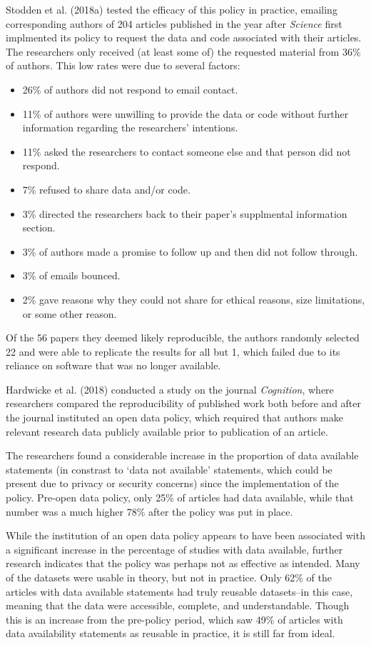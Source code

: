 \documentclass[12pt,twoside]{reedthesis}
\providecommand{\tightlist}{%
  \setlength{\itemsep}{0pt}\setlength{\parskip}{0pt}}
\begin{document}
Stodden et al. (2018a) tested the efficacy of this policy in practice, emailing corresponding authors of 204 articles published in the year after \emph{Science} first implmented its policy to request the data and code associated with their articles. The researchers only received (at least some of) the requested material from 36\% of authors. This low rates were due to several factors:
\begin{itemize}
\tightlist
\item
  26\% of authors did not respond to email contact.
\item
  11\% of authors were unwilling to provide the data or code without further information regarding the researchers' intentions.
\item
  11\% asked the researchers to contact someone else and that person did not respond.
\item
  7\% refused to share data and/or code.
\item
  3\% directed the researchers back to their paper's supplmental information section.
\item
  3\% of authors made a promise to follow up and then did not follow through.
\item
  3\% of emails bounced.
\item
  2\% gave reasons why they could not share for ethical reasons, size limitations, or some other reason.
\end{itemize}
Of the 56 papers they deemed likely reproducible, the authors randomly selected 22 and were able to replicate the results for all but 1, which failed due to its reliance on software that was no longer available.

Hardwicke et al. (2018) conducted a study on the journal \emph{Cognition}, where researchers compared the reproducibility of published work both before and after the journal instituted an open data policy, which required that authors make relevant research data publicly available prior to publication of an article.

The researchers found a considerable increase in the proportion of data available statements (in constrast to `data not available' statements, which could be present due to privacy or security concerns) since the implementation of the policy. Pre-open data policy, only 25\% of articles had data available, while that number was a much higher 78\% after the policy was put in place.

While the institution of an open data policy appears to have been associated with a significant increase in the percentage of studies with data available, further research indicates that the policy was perhaps not as effective as intended. Many of the datasets were usable in theory, but not in practice. Only 62\% of the articles with data available statements had truly reusable datasets--in this case, meaning that the data were accessible, complete, and understandable. Though this is an increase from the pre-policy period, which saw 49\% of articles with data availability statements as reusable in practice, it is still far from ideal.
\end{document}
